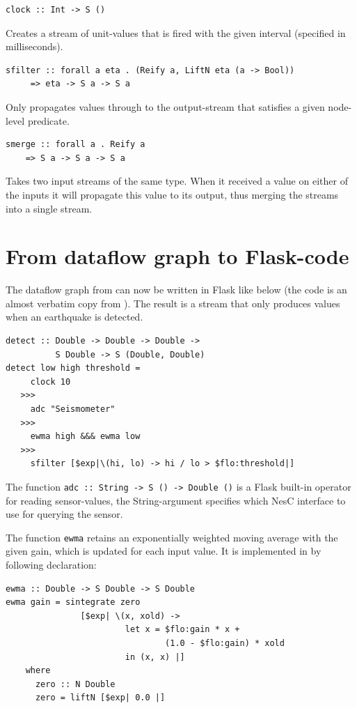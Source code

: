 \documentclass[a4paper, oneside, final]{memoir}
\let\fref\undefined
\begin{document}
\begin{description}
\item
\begin{verbatim}
clock :: Int -> S ()
\end{verbatim}
  Creates a stream of unit-values
  that is fired with the given interval (specified in milliseconds).

\item
\begin{verbatim}
sfilter :: forall a eta . (Reify a, LiftN eta (a -> Bool))
     => eta -> S a -> S a
\end{verbatim}
  Only propagates values through to the
  output-stream that satisfies a given node-level predicate.
  
\item
\begin{verbatim}
smerge :: forall a . Reify a
    => S a -> S a -> S a
\end{verbatim}
Takes two input streams of the same type. When it received a value on
either of the inputs it will propagate this value to its output, thus
merging the streams into a single stream.

\end{description}
\newpage
\section{From dataflow graph to Flask-code}
The dataflow graph from \fref{fig:ewma-example} can now be written
in Flask like below (the code is an almost verbatim copy from
\cite{flask08}). The result is a stream that only produces values when
an earthquake is detected.
\begin{verbatim}
detect :: Double -> Double -> Double -> 
          S Double -> S (Double, Double)
detect low high threshold = 
     clock 10
   >>>
     adc "Seismometer"
   >>>
     ewma high &&& ewma low
   >>>
     sfilter [$exp|\(hi, lo) -> hi / lo > $flo:threshold|]
\end{verbatim}

\noindent
The function \texttt{adc :: String -> S () -> Double ()} is a Flask
built-in operator for reading sensor-values, the String-argument
specifies which NesC interface to use for querying the sensor.

The function \texttt{ewma} retains an exponentially weighted moving
average with the given gain, which is updated for each input
value. It is implemented in \cite{flask08} by following declaration:

\begin{verbatim}
ewma :: Double -> S Double -> S Double
ewma gain = sintegrate zero
               [$exp| \(x, xold) ->
                        let x = $flo:gain * x +
                                (1.0 - $flo:gain) * xold
                        in (x, x) |]
    where
      zero :: N Double
      zero = liftN [$exp| 0.0 |]
\end{verbatim}
\end{document}
